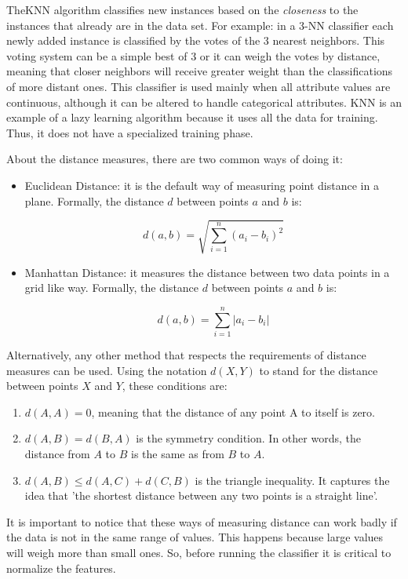 TheKNN algorithm classifies new instances based on the \emph{closeness} to the instances that already are in the data set. For example: in a 3-NN classifier each newly added instance is classified by the votes of the 3 nearest neighbors. This voting system can be a simple best of 3 or it can weigh the votes by distance, meaning that closer neighbors will receive greater weight than the classifications of more distant ones. This classifier is used mainly when all attribute values are continuous, although it can be altered to handle categorical attributes. 
KNN is an example of a lazy learning algorithm because it uses all the data for training. Thus, it does not have a specialized training phase.

About the distance measures, there are two common ways of doing it:

\begin{itemize}
    \item Euclidean Distance: it is the default way of measuring point distance in a plane. Formally, the distance $d$ between points $a$ and $b$ is:

    \[ d(a,b) = \sqrt{\sum_{i=1}^n {(a_i - b_i)}^2} \]

    \item Manhattan Distance: it measures the distance between two data points in a grid like way. Formally, the distance $d$ between points $a$ and $b$ is:
    
    \[ d(a,b) = \sum_{i=1}^n {|a_i - b_i|} \]
\end{itemize}

Alternatively, any other method that respects the requirements of distance measures can be used. Using the notation $d(X,Y)$ to stand for the distance between points $X$ and $Y$, these conditions are:

\begin{enumerate}
    \item $d(A,A) = 0$, meaning that the distance of any point A to itself is zero.
    \item $d(A,B) = d(B,A)$ is the symmetry condition. In other words, the distance from $A$ to $B$ is the same as from $B$ to $A$.
    \item $d(A,B) \le d(A,C) + d(C,B)$ is the triangle inequality. It captures the idea that 'the shortest distance between any two points is a straight line'.
\end{enumerate}

It is important to notice that these ways of measuring distance can work badly if the data is not in the same range of values. This happens because large values will weigh more than small ones. So, before running the classifier it is critical to normalize the features.

